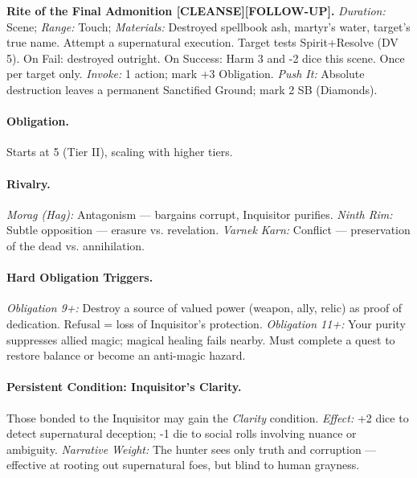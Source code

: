 \documentclass[11pt]{article}
\begin{document}
\textbf{Rite of the Final Admonition [CLEANSE][FOLLOW-UP].}
\emph{Duration:} Scene; \emph{Range:} Touch; \emph{Materials:} Destroyed spellbook ash, martyr’s water, target’s true name.
Attempt a supernatural execution. Target tests Spirit+Resolve (DV 5). On Fail: destroyed outright. On Success: Harm 3 and -2 dice this scene. Once per target only.
\emph{Invoke:} 1 action; mark +3 Obligation.
\emph{Push It:} Absolute destruction leaves a permanent Sanctified Ground; mark 2 SB (Diamonds).

\paragraph{Obligation.}
Starts at 5 (Tier II), scaling with higher tiers.

\paragraph{Rivalry.}
\emph{Morag (Hag):} Antagonism --- bargains corrupt, Inquisitor purifies.
\emph{Ninth Rim:} Subtle opposition --- erasure vs. revelation.
\emph{Varnek Karn:} Conflict --- preservation of the dead vs. annihilation.

\paragraph{Hard Obligation Triggers.}
\emph{Obligation 9+:} Destroy a source of valued power (weapon, ally, relic) as proof of dedication. Refusal = loss of Inquisitor’s protection.
\emph{Obligation 11+:} Your purity suppresses allied magic; magical healing fails nearby. Must complete a quest to restore balance or become an anti-magic hazard.

\paragraph{Persistent Condition: Inquisitor’s Clarity.}
Those bonded to the Inquisitor may gain the \emph{Clarity} condition.
\emph{Effect:} +2 dice to detect supernatural deception; -1 die to social rolls involving nuance or ambiguity.
\emph{Narrative Weight:} The hunter sees only truth and corruption --- effective at rooting out supernatural foes, but blind to human grayness.
\end{document}
